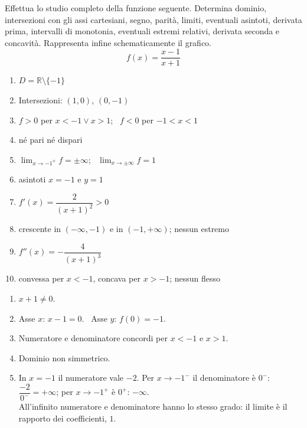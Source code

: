 
\begin{question}[ID=2.2, subtitle={Studio completo di una funzione razionale}, difficulty=media, tags={funzioni, studio di funzione, funzioni razionali}]
Effettua lo studio completo della funzione seguente. Determina dominio, intersezioni con gli assi cartesiani, segno, parità, limiti, eventuali asintoti, derivata prima, intervalli di monotonia, eventuali estremi relativi, derivata seconda e concavità. Rappresenta infine schematicamente il grafico.
\begin{equation*}
    f(x)=\dfrac{x-1}{x+1}
\end{equation*}
\begin{solution}
\begin{enumerate}
    \item $D=\mathbb{R}\setminus\{-1\}$
    \item Intersezioni: $(1,0)$, $(0,-1)$
    \item $f>0$ per $x<-1\vee x>1$; \ $f<0$ per $-1<x<1$
    \item né pari né dispari
    \item $\lim_{x\to-1^\mp}f=\pm\infty$; \ $\lim_{x\to\pm\infty}f=1$
    \item asintoti $x=-1$ e $y=1$
    \item $f'(x)=\dfrac{2}{(x+1)^2}>0$
    \item crescente in $(-\infty,-1)$ e in $(-1,+\infty)$; nessun estremo
    \item $f''(x)=-\dfrac{4}{(x+1)^3}$
    \item convessa per $x<-1$, concava per $x>-1$; nessun flesso
\end{enumerate}
\end{solution}
\begin{explanation}
\begin{enumerate}
    \item $x+1\neq0$.
    \item Asse $x$: $x-1=0$. \ Asse $y$: $f(0)=-1$.
    \item Numeratore e denominatore concordi per $x<-1$ e $x>1$.
    \item Dominio non simmetrico.
    \item In $x=-1$ il numeratore vale $-2$. Per $x\to-1^-$ il denominatore è $0^-$: $\dfrac{-2}{0^-}=+\infty$; per $x\to-1^+$ è $0^+$: $-\infty$. \\
    All'infinito numeratore e denominatore hanno lo stesso grado: il limite è il rapporto dei coefficienti, $1$.

\end{enumerate}
\end{explanation}
\end{question}
